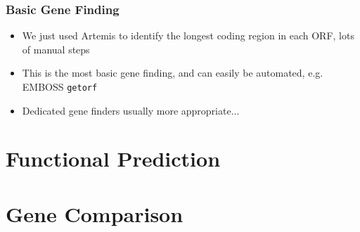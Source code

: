 \documentclass[table]{beamer}
\begin{document}
\begin{frame}
    \frametitle{Basic Gene Finding}
    \begin{itemize}
      \item<1-> We just used Artemis to identify the longest coding region in each ORF, lots of manual steps
      \item<2-> This is the most basic gene finding, and can easily be automated, e.g. EMBOSS \texttt{getorf}
      \item<3-> Dedicated gene finders usually more appropriate...
    \end{itemize}
\end{frame}

\section{Functional Prediction}

\section{Gene Comparison}

\end{document}

